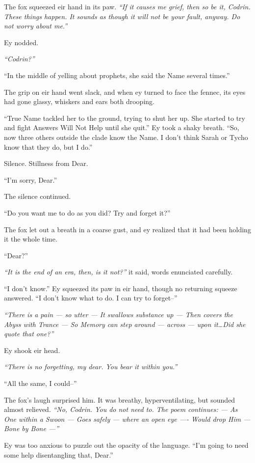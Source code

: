 The fox squeezed eir hand in its paw. \emph{``If it causes me grief, then so be it, Codrin. These things happen. It sounds as though it will not be your fault, anyway. Do not worry about me.''}

Ey nodded.

\emph{``Codrin?''}

``In the middle of yelling about prophets, she said the Name several times.''

The grip on eir hand went slack, and when ey turned to face the fennec, its eyes had gone glassy, whiskers and ears both drooping.

``True Name tackled her to the ground, trying to shut her up. She started to try and fight Answers Will Not Help until she quit.'' Ey took a shaky breath. ``So, now three others outside the clade know the Name. I don't think Sarah or Tycho know that they do, but I do.''

Silence. Stillness from Dear.

``I'm sorry, Dear.''

The silence continued.

``Do you want me to do as you did? Try and forget it?''

The fox let out a breath in a coarse gust, and ey realized that it had been holding it the whole time.

``Dear?''

\emph{``It is the end of an era, then, is it not?''} it said, words enunciated carefully.

``I don't know.'' Ey squeezed its paw in eir hand, though no returning squeeze answered. ``I don't know what to do. I can try to forget--''

\emph{``There is a pain — so utter — It swallows substance up — Then covers the Abyss with Trance — So Memory can step around — across — upon it\ldots Did she quote that one?''}

Ey shook eir head.

\emph{``There is no forgetting, my dear. You bear it within you.''}

``All the same, I could--''

The fox's laugh surprised him. It was breathy, hyperventilating, but sounded almost relieved. \emph{``No, Codrin. You do not need to. The poem continues: — As One within a Swoon — Goes safely — where an open eye —- Would drop Him — Bone by Bone —''}

Ey was too anxious to puzzle out the opacity of the language. ``I'm going to need some help disentangling that, Dear.''

